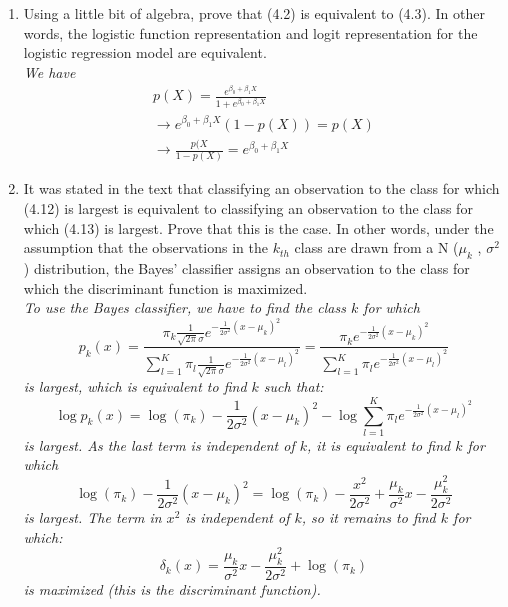 \documentclass[12pt]{article}
\begin{document}
\begin{enumerate}
    \item Using a little bit of algebra, prove that (4.2) is equivalent to (4.3). In other words, the logistic function representation and logit representation for the logistic regression model are equivalent.
    \\ \textit{We have}
    \begin{align*}
        p(X) = \frac{e^{\beta_0 + \beta_1X}}{1 + e^{\beta_0 + \beta_1X}}
        \\\rightarrow e^{\beta_0 + \beta_1X}(1-p(X)) = p(X)
        \\\rightarrow \frac{p(X}{1-p(X)}=e^{\beta_0 + \beta_1X}
    \end{align*}
    \item It was stated in the text that classifying an observation to the class for which (4.12) is largest is equivalent to classifying an observation to the class for which (4.13) is largest. Prove that this is the case. In other words, under the assumption that the observations in the $k_{th}$ class are drawn from a N ($\mu_k$ , $\sigma^2$ ) distribution, the Bayes’ classifier assigns an observation to the class for which the discriminant function is maximized.
    \\\textit{To use the Bayes classifier, we have to find the class $k$ for which
    \begin{equation*}
        p_k(x) = \frac{\pi_k\frac{1}{\sqrt{2\pi}\sigma}e^{-\frac{1}{2\sigma^2}(x - \mu_k)^2}}{\sum_{l = 1}^K\pi_l\frac{1}{\sqrt{2\pi}\sigma}e^{-\frac{1}{2\sigma^2}(x - \mu_l)^2}} = \frac{\pi_ke^{-\frac{1}{2\sigma^2}(x - \mu_k)^2}}{\sum_{l = 1}^K\pi_le^{-\frac{1}{2\sigma^2}(x - \mu_l)^2}}
        \end{equation*}
    is largest, which is equivalent to find $k$ such that:
    \begin{equation*}
        \log p_k(x) = \log (\pi_k) -\frac{1}{2\sigma^2}(x - \mu_k)^2 - \log \sum_{l = 1}^K\pi_le^{-\frac{1}{2\sigma^2}(x - \mu_l)^2}
    \end{equation*}
    is largest. As the last term is independent of $k$, it is equivalent to find $k$ for which
    \begin{equation*}
        \log (\pi_k) -\frac{1}{2\sigma^2}(x - \mu_k)^2 = \log(\pi_k) - \frac{x^2}{2\sigma^2} + \frac{\mu_k}{\sigma^2}x - \frac{\mu_k^2}{2\sigma^2}
    \end{equation*}
    is largest. The term in $x^2$ is independent of $k$, so it remains to find $k$ for which:
    \begin{equation*}
        \delta_k(x) = \frac{\mu_k}{\sigma^2}x - \frac{\mu_k^2}{2\sigma^2} + \log(\pi_k)
    \end{equation*}
    is maximized (this is the discriminant function).}
\end{enumerate}

 
\end{document}
